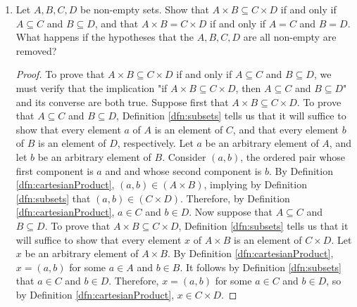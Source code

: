 \documentclass[../main.tex]{subfiles}
\begin{document}
\begin{enumerate}[ref={\thesection.\arabic*}]
\begin{proof}
    \end{proof}
    \item \label{exr:3.5.6}Let $A,B,C,D$ be non-empty sets. Show that $A\times B\subseteq C\times D$ if and only if $A\subseteq C$ and $B\subseteq D$, and that $A\times B=C\times D$ if and only if $A=C$ and $B=D$. What happens if the hypotheses that the $A,B,C,D$ are all non-empty are removed?
    \begin{proof}
        To prove that $A\times B\subseteq C\times D$ if and only if $A\subseteq C$ and $B\subseteq D$, we must verify that the implication "if $A\times B\subseteq C\times D$, then $A\subseteq C$ and $B\subseteq D$" and its converse are both true. Suppose first that $A\times B\subseteq C\times D$. To prove that $A\subseteq C$ and $B\subseteq D$, Definition \ref{dfn:subsets} tells us that it will suffice to show that every element $a$ of $A$ is an element of $C$, and that every element $b$ of $B$ is an element of $D$, respectively. Let $a$ be an arbitrary element of $A$, and let $b$ be an arbitrary element of $B$. Consider $(a,b)$, the ordered pair whose first component is $a$ and and whose second component is $b$. By Definition \ref{dfn:cartesianProduct}, $(a,b)\in(A\times B)$, implying by Definition \ref{dfn:subsets} that $(a,b)\in(C\times D)$. Therefore, by Definition \ref{dfn:cartesianProduct}, $a\in C$ and $b\in D$. Now suppose that $A\subseteq C$ and $B\subseteq D$. To prove that $A\times B\subseteq C\times D$, Definition \ref{dfn:subsets} tells us that it will suffice to show that every element $x$ of $A\times B$ is an element of $C\times D$. Let $x$ be an arbitrary element of $A\times B$. By Definition \ref{dfn:cartesianProduct}, $x=(a,b)$ for some $a\in A$ and $b\in B$. It follows by Definition \ref{dfn:subsets} that $a\in C$ and $b\in D$. Therefore, $x=(a,b)$ for some $a\in C$ and $b\in D$, so by Definition \ref{dfn:cartesianProduct}, $x\in C\times D$.\par

\end{proof}
\end{enumerate}
\end{document}

